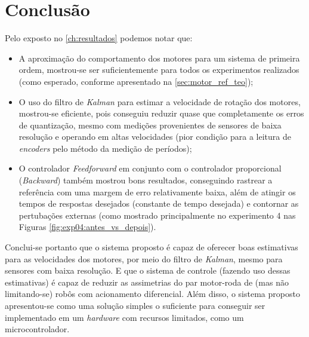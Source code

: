 \chapter[Conclusão]{Conclusão}
\label{ch:conclusao}


Pelo exposto no \autoref{ch:resultados} podemos notar que: 

\begin{itemize}
    \item A aproximação do comportamento dos motores para um sistema de primeira ordem, mostrou-se ser suficientemente para todos os experimentos realizados (como esperado, conforme apresentado na \autoref{sec:motor_ref_teo});
    \item O uso do filtro de \emph{Kalman} para estimar a velocidade de rotação dos motores, mostrou-se eficiente, pois conseguiu reduzir quase que completamente os erros de quantização, mesmo com medições provenientes de sensores de baixa resolução e operando em altas velocidades (pior condição para a leitura de \emph{encoders} pelo método da medição de períodos);
    \item O controlador \emph{Feedforward} em conjunto com o controlador proporcional (\emph{Backward}) também mostrou bons resultados, conseguindo rastrear a referência com uma margem de erro relativamente baixa, além de atingir os tempos de respostas desejados (constante de tempo desejada) e contornar as pertubações externas (como mostrado principalmente no experimento 4 nas Figuras \ref{fig:exp04:antes_vs_depois}).\\
\end{itemize}


Conclui-se portanto que o sistema proposto é capaz de oferecer boas estimativas para as velocidades dos motores, por meio do filtro de \emph{Kalman}, mesmo para sensores com baixa resolução. E que o sistema de controle (fazendo uso dessas estimativas) é capaz de reduzir as assimetrias do par motor-roda de (mas não limitando-se) robôs com acionamento diferencial. Além disso, o sistema proposto apresentou-se como uma solução simples o suficiente para conseguir ser implementado em um \emph{hardware} com recursos limitados, como um  microcontrolador.\\

